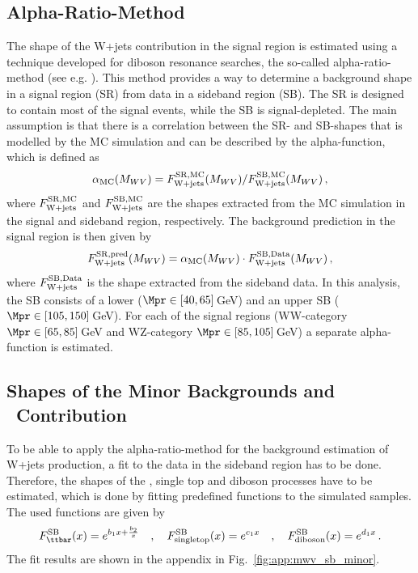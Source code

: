 \subsection{Alpha-Ratio-Method}
\label{sec:AlphaRatioMethod}
The shape of the W+jets contribution in the signal region is estimated using a technique developed for diboson resonance searches, the so-called alpha-ratio-method (see e.g. \cite{resonancepas}). This method provides a way to determine a background shape in a signal region (SR) from data in a sideband region (SB). The SR is designed to contain most of the signal events, while the SB is signal-depleted. The main assumption is that there is a correlation between the SR- and SB-shapes that is modelled by the MC simulation and can be described by the alpha-function, which is defined as
\begin{align}
\alpha_{\rm MC}(M_{WV})=F_{\rm W+jets}^{\rm SR,MC}(M_{WV})/F_{\rm W+jets}^{\rm SB,MC}(M_{WV}) \, ,
\end{align}
where $F_{\rm W+jets}^{\rm SR,MC}$ and $F_{\rm W+jets}^{\rm SB,MC}$ are the shapes extracted from the MC simulation in the signal and sideband region, respectively. The background prediction in the signal region is then given by
\begin{equation}
F_{\rm W+jets}^{\rm SR,pred}(M_{WV})=\alpha_{\rm MC}(M_{WV})\cdot F_{\rm W+jets}^{\rm SB,Data}(M_{WV}) \, ,
\end{equation}
where $F_{\rm W+jets}^{\rm SB,Data}$ is the shape extracted from the sideband data. In this analysis, the SB consists of a lower ($\Mpr \in [40,65]$\,GeV) and an upper SB ($\Mpr \in [105,150]$\,GeV). For each of the signal regions (WW-category $\Mpr \in [65,85]$\,GeV and WZ-category $\Mpr \in [85,105]$\,GeV) a separate alpha-function is estimated.

\subsection{Shapes of the Minor Backgrounds and \ttbar \ Contribution}
\label{sec:minbkgshapes}
To be able to apply the alpha-ratio-method for the background estimation of W+jets production, a fit to the data in the sideband region has to be done. Therefore, the shapes of the \ttbar , single top and diboson processes have to be estimated, which is done by fitting predefined functions to the simulated samples. The used functions are given by
\begin{equation}
F_{\ttbar}^{\rm SB}(x) = e^{b_1x+\frac{b_2}{x}} \quad , \quad
F_{\rm singletop}^{\rm SB}(x) = e^{c_1x} \quad , \quad 
F_{\rm diboson}^{\rm SB}(x) = e^{d_1x} \, .
\end{equation}
The fit results are shown in the appendix in Fig.~\ref{fig:app:mwv_sb_minor}.\\

